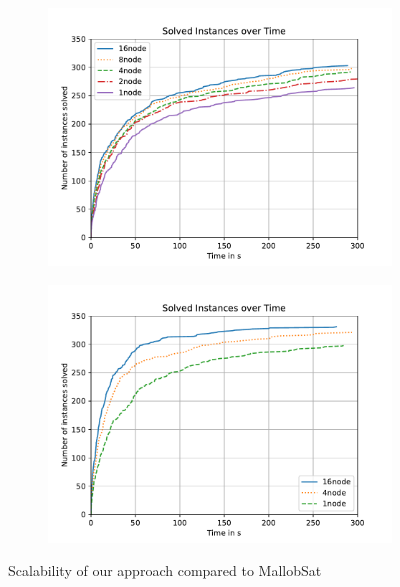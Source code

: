 \documentclass[12pt,a4paper,twoside]{scrartcl}
\numberwithin{equation}{section}
\begin{document}
\begin{figure}
  \center
  \begin{subfigure}[c]{.45\textwidth}
    \center
    \includegraphics[scale=.45]{plots/cumulative_runtime/scalability_gim.pdf}
    \label{fig:runtimeCompareGim}
  \end{subfigure}
  \hfill
  \begin{subfigure}[c]{.45\textwidth}
    \center
    \includegraphics[scale=.45]{plots/cumulative_runtime/scalability_kis.pdf}
    \label{fig:runtimeCompareKis}
  \end{subfigure}
  \caption{Scalability of our approach compared to MallobSat}
  \label{fig:scale}
\end{figure}
\end{document}
